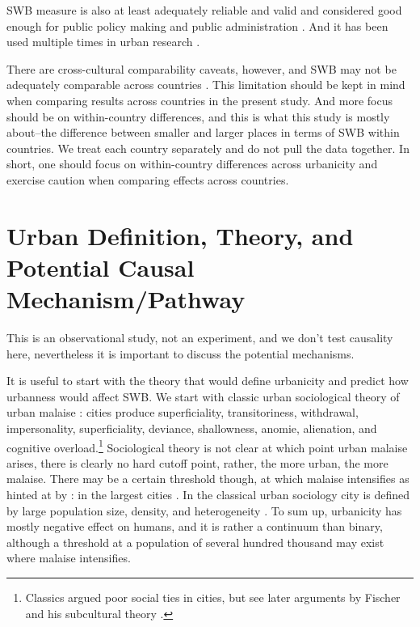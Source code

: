 \documentclass[10pt, letterpaper]{article}
\begin{document}
SWB measure is also at least adequately reliable and valid and considered good
enough for public policy making and public administration
\citep{diener09,stiglitz09al}. And it has been used multiple times in urban
research \citep[e.g.,][]{moeinaddini20,mouratidis19,wang19,anon17-cities-oslo,ma17,wkeziak16,valente16,chen15}.

There are cross-cultural comparability caveats, however, and SWB may not be
adequately comparable across countries \citep{kahneman99,diener09}. This limitation should be kept in
mind when comparing results across countries in the present study. And more
focus should be on within-country differences, and this is what this study is
mostly about--the difference between smaller and larger places in terms of SWB
within countries. We treat each country separately and do not pull the data
together. In short, one should focus on within-country differences across
urbanicity and exercise caution when comparing effects across countries. 

\section{Urban Definition, Theory, and Potential Causal Mechanism/Pathway}

{This
  is an observational study, not an experiment, and we don't test causality here,
  nevertheless it is important to discuss the potential mechanisms.}

It is useful to start with the theory that would define urbanicity and predict how
urbanness would affect SWB. %
%
We start with classic urban sociological theory of urban malaise
 \citep{tonnies57,wirth38,simmel03,park15,park84}: cities produce superficiality,
transitoriness, withdrawal, impersonality, superficiality, deviance,
shallowness, anomie, alienation, and cognitive overload.\footnote{Classics
  argued poor social ties in cities, but see later arguments by Fischer  and his
  subcultural theory \citep{fischer95,fischer75,fischer72}.} 
 Sociological theory is not clear at which point urban malaise arises, there is clearly no hard
cutoff point, rather, the more urban, the more malaise. There may be a certain
threshold though, at which malaise intensifies as hinted at by
\citet{fischer73}: in the largest cities%
.
 In the classical urban sociology city is defined by large population size, density,
and heterogeneity \citep{wirth38}. To sum up, urbanicity has mostly negative
effect on humans, and it is rather a continuum than binary, although a threshold
at a population of several hundred thousand may exist where malaise intensifies.
\end{document}
